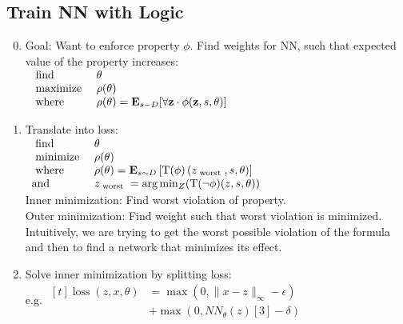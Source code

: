 \documentclass[11pt]{extarticle}
\begin{document}
\begin{multicols*}{3}
\begin{enumerate}[leftmargin=*]
            \end{enumerate}
		    \subsection*{Train NN with Logic}
		    \begin{enumerate}[leftmargin=*]
		    \setcounter{enumi}{-1}
		    \item
		    Goal: Want to enforce property $\phi$.
		    Find weights for NN, such that expected value of the property increases:\\
            $\begin{array} { l l } { \text { find } } & { \theta } \\ { \text { maximize } } & { \rho ( \theta ) } \\ { \text { where } } & { \rho ( \theta ) = \mathbf { E } _ { s - D } [ \forall \mathbf { z } \cdot \phi ( \mathbf { z } , s , \theta ) ] } \end{array}$
            \item Translate into loss:\\
            $\begin{array} {l l l l } 
            { \text { find } } & { \theta } \\ { \text { minimize }}  & { \rho ( \theta )} \\
            { \text { where } } & {\rho ( \theta ) = \mathbf { E } _ { s \sim D } \left[ \mathrm { T } ( \phi ) \left( z _ { \text { worst }} , s , \theta \right) \right]} \\
            {\text{and}} & {z _ {\text { worst }} = \arg \min _ { Z } ( \mathrm { T } ( \neg \phi ) ( z , s , \theta ) )}
            \end{array}$\\
            Inner minimization: Find worst violation of property.\\
            Outer minimization: Find weight such that worst violation is minimized.\\
            Intuitively, we are trying to get the
            worst possible violation of the formula and then to find a
            network that minimizes its effect.\\
            \item Solve inner minimization by splitting loss:\\
            e.g.
            $\begin{aligned}[t]
            \operatorname { loss } ( z , x , \theta ) &= \max \left( 0 , \| x - z \| _ { \infty } - \epsilon \right) \\
            & + \max \left( 0 , N N _ { \theta } ( z ) [ 3 ] - \delta \right)
            \end{aligned}$\\
            

\end{enumerate}
\end{multicols*}
\end{document}
